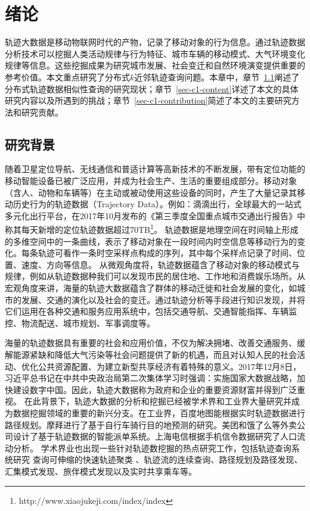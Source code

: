 \chapter{绪论}\label{capater:intro}
轨迹大数据是移动物联网时代的产物，记录了移动对象的行为信息。通过轨迹数据分析技术可以挖掘人类活动规律与行为特征、城市车辆的移动模式、大气环境变化规律等信息。这些挖掘成果为研究城市发展、社会变迁和自然环境演变提供重要的参考价值。本文重点研究了分布式$k$近邻轨迹查询问题。本章中，章节~\ref{sec-c1-background}阐述了分布式轨迹数据相似性查询的研究现状；章节~\ref{sec-c1-content}详述了本文的具体研究内容以及所遇到的挑战；章节~\ref{sec-c1-contribution}简述了本文的主要研究方法和研究贡献。

\section{研究背景}\label{sec-c1-background}
        随着卫星定位导航、无线通信和普适计算等高新技术的不断发展，带有定位功能的移动智能设备已被广泛应用，并成为社会生产、生活的重要组成部分。移动对象（含人、动物和车辆等）在主动或被动使用这些设备的同时，产生了大量记录其移动历史行为的轨迹数据（Trajectory Data）。例如：滴滴出行，全球最大的一站式多元化出行平台，在2017年10月发布的《第三季度全国重点城市交通出行报告》中称其每天新增的定位轨迹数据超过70TB\footnote{http://www.xiaojukeji.com/index/index}。
            轨迹数据是地理空间在时间轴上形成的多维空间中的一条曲线，表示了移动对象在一段时间内时空信息等移动行为的变化。每条轨迹可看作一条时空采样点构成的序列，其中每个采样点记录了时间、位置、速度、方向等信息。 从微观角度将，轨迹数据蕴含了移动对象的移动模式与规律，例如从轨迹数据种我们可以发现市民的居住地、工作地和消费娱乐场所。从宏观角度来讲，海量的轨迹大数据蕴含了群体的移动迁徙和社会发展的变化，如城市的发展、交通的演化以及社会的变迁。通过轨迹分析等手段进行知识发现，并将它们运用在各种交通和服务应用系统中，包括交通导航、交通智能指挥、车辆监控、物流配送、城市规划、军事调度等\cite{Zheng15}。
        
         海量的轨迹数据具有重要的社会和应用价值，不仅为解决拥堵、改善交通服务、缓解能源紧缺和降低大气污染等社会问题提供了新的机遇，而且对认知人民的社会活动、优化公共资源配置、为建立新型共享经济有着特殊的意义。2017年12月8日，习近平总书记在中共中央政治局第二次集体学习时强调：实施国家大数据战略，加快建设数字中国。因此，轨迹大数据称为政府和企业的重要资源财富并得到广泛重视。
         在此背景下，轨迹大数据的分析和挖掘已经被学术界和工业界大量研究并成为数据挖掘领域的重要的新兴分支。在工业界，百度地图能根据实时轨迹数据进行路径规划。摩拜进行了基于自行车骑行目的地预测的研究。美团和饿了么等外卖公司设计了基于轨迹数据的智能派单系统。上海电信根据手机信令数据研究了人口流动分析。
         学术界业也出现一些针对轨迹数挖掘的热点研究工作，包括轨迹查询系统研究\cite{SharkDB,TanLN12,TrajSpark,trajectoryVLDB}
         查询可伸缩的快速轨迹聚类 \cite{DengHZHD15,CostaMM14,YuWWWH13,MaoSJZZ16}、轨迹流的连续查询\cite{NehmeR06}、路径规划及路径发现\cite{SacharidisPTKPMS08}、汇集模式发现\cite{ZhengZYS13}、旅伴模式发现\cite{TangZYHLHP12,LiCJT13}以及实时共享乘车\cite{DuanJWZY16}等。 
         
